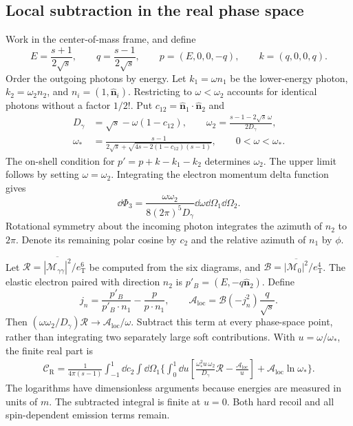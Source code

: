 \subsection{Local subtraction in the real phase space}
Work in the center-of-mass frame, and define
\begin{equation}
 E=\frac{s+1}{2\sqrt s},\qquad q=\frac{s-1}{2\sqrt s},\qquad
 p=(E,0,0,-q),\qquad k=(q,0,0,q).
\end{equation}
Order the outgoing photons by energy. Let $k_1=\omega n_1$ be
the lower-energy photon, $k_2=\omega_2 n_2$, and
$n_i=(1,\widehat{\bm n}_i)$. Restricting to $\omega<\omega_2$
accounts for identical photons without a factor $1/2!$.
Put $c_{12}=\widehat{\bm n}_1\cdot\widehat{\bm n}_2$ and
\begin{align}
 D_\gamma&=\sqrt s-\omega(1-c_{12}),\qquad
 \omega_2=\frac{s-1-2\sqrt s\,\omega}{2D_\gamma},\\
 \omega_*&=\frac{s-1}{2\sqrt s+
                 \sqrt{4s-2(1-c_{12})(s-1)}},\qquad 0<\omega<\omega_*.
\end{align}
The on-shell condition for $p'=p+k-k_1-k_2$ determines $\omega_2$.
The upper limit follows by setting $\omega=\omega_2$.
Integrating the electron momentum delta function gives
\begin{equation}
 \dd\Phi_3=\frac{\omega\omega_2}{8(2\pi)^5D_\gamma}
                \dd\omega\dd\Omega_1\dd\Omega_2.
\end{equation}
Rotational symmetry about the incoming photon integrates the
azimuth of $n_2$ to $2\pi$. Denote its remaining polar cosine by
$c_2$ and the relative azimuth of $n_1$ by $\phi$.

Let $\mathcal R=\overline{|\mathcal M_{\gamma\gamma}|^2}/e_{\mathrm T}^6$
be computed from the six diagrams, and
$\mathcal B=\overline{|\mathcal M_0|^2}/e_{\mathrm T}^4$.
The elastic electron paired with direction $n_2$ is
$p'_B=(E,-q\widehat{\bm n}_2)$. Define
\begin{equation}
 j_n=\frac{p'_B}{p'_B\cdot n_1}-\frac p{p\cdot n_1},\qquad
 \mathcal A_{\mathrm{loc}}=\mathcal B(-j_n^2)\frac q{\sqrt s}.
\end{equation}
Then $(\omega\omega_2/D_\gamma)\mathcal R\to\mathcal A_{\mathrm{loc}}/\omega$.
Subtract this term at every phase-space point, rather than
integrating two separately large soft contributions. With
$u=\omega/\omega_*$, the finite real part is
\begin{equation}
 \begin{aligned}
 \mathcal C_{\mathrm R}=
 \frac1{4\pi(s-1)}\int_{-1}^1\dd c_2\int\dd\Omega_1
 \bigg\{\int_0^1\dd u\left[
 \frac{\omega_*^2u\,\omega_2}{D_\gamma}\mathcal R
          -\frac{\mathcal A_{\mathrm{loc}}}{u}\right]
       +\mathcal A_{\mathrm{loc}}\ln\omega_*\bigg\}.
 \end{aligned}
 \label{eq:comp-supp-real-subtracted}
\end{equation}
The logarithms have dimensionless arguments because energies are
measured in units of $m$. The subtracted integral is finite at
$u=0$. Both hard recoil and all spin-dependent emission terms remain.


